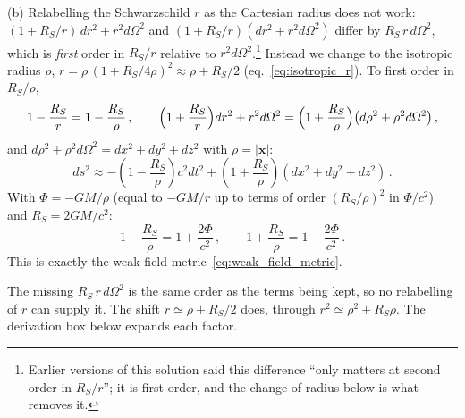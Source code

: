 (b) Relabelling the Schwarzschild $r$ as the Cartesian radius
does not work: $(1 + R_S/r)\,dr^2 + r^2 d\Omega^2$ and
$(1 + R_S/r)(dr^2 + r^2 d\Omega^2)$ differ by $R_S\,r\,d\Omega^2$, which is
\emph{first} order in $R_S/r$ relative to $r^2 d\Omega^2$.\footnote{Earlier
versions of this solution said this difference ``only matters at second
order in $R_S/r$''; it is first order, and the change of radius below is
what removes it.}  Instead we change to the isotropic radius $\rho$,
$r = \rho\,(1 + R_S/4\rho)^2 \approx \rho + R_S/2$
(eq.~\eqref{eq:isotropic_r}).  To first order in $R_S/\rho$,
\[
    1 - \frac{R_S}{r} = 1 - \frac{R_S}{\rho} \,, \qquad
    \Bigl(1 + \frac{R_S}{r}\Bigr)dr^2 + r^2 d\Omega^2
    = \Bigl(1 + \frac{R_S}{\rho}\Bigr)\bigl(d\rho^2 + \rho^2 d\Omega^2\bigr) \,,
\]
and $d\rho^2 + \rho^2 d\Omega^2 = dx^2 + dy^2 + dz^2$ with
$\rho = |\mathbf{x}|$:
\[
    ds^2 \approx -\left(1 - \frac{R_S}{\rho}\right) c^2 dt^2
    + \left(1 + \frac{R_S}{\rho}\right)(dx^2 + dy^2 + dz^2) \,.
\]
With $\Phi = -GM/\rho$ (equal to $-GM/r$ up to terms of order
$(R_S/\rho)^2$ in $\Phi/c^2$) and $R_S = 2GM/c^2$:
\[
    1 - \frac{R_S}{\rho} = 1 + \frac{2\Phi}{c^2} \,, \qquad
    1 + \frac{R_S}{\rho} = 1 - \frac{2\Phi}{c^2} \,.
\]
This is exactly the weak-field metric~\eqref{eq:weak_field_metric}.

\begin{annotation}
The missing $R_S\,r\,d\Omega^2$ is the same order as the terms being kept,
so no relabelling of $r$ can supply it.  The shift $r \simeq \rho + R_S/2$
does, through $r^2 \simeq \rho^2 + R_S\rho$.  The derivation box below
expands each factor.
\end{annotation}

